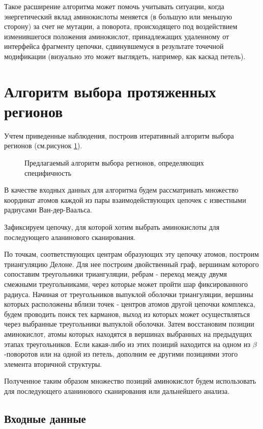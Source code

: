 Такое расширение алгоритма может помочь учитывать ситуации, когда энергетический вклад аминокислоты меняется (в большую или меньшую сторону) за счет не мутации, а поворота, происходящего под воздействием изменившегося положения аминокислот, принадлежащих удаленному от интерфейса фрагменту цепочки, сдвинувшемуся в результате точечной модификации (визуально это может выглядеть, например, как каскад петель). 



\section{Алгоритм выбора протяженных регионов}
Учтем приведенные наблюдения, построив итеративный алгоритм выбора регионов (см.рисунок \ref{fig:algo_scheme}).
\begin{figure}
\resizebox{\linewidth}{!}{
\algoscheme
}
\caption{\small{Предлагаемый алгоритм выбора регионов, определяющих специфичность }}
\label{fig:algo_scheme}
\end{figure}
В качестве входных данных для алгоритма будем рассматривать множество координат атомов каждой из пары взаимодействующих цепочек с известными радиусами Ван-дер-Ваальса.

Зафиксируем цепочку, для которой хотим выбрать аминокислоты для последующего аланинового сканирования. 

По точкам, соответствующих центрам образующих эту цепочку атомов, построим триангуляцию Делоне. Для нее построим двойственный граф, вершинам которого сопоставим треугольники триангуляции, ребрам - переход между двумя смежными треугольниками, через которые может пройти  шар фиксированного радиуса. Начиная от треугольников выпуклой оболочки триангуляции, вершины которых расположены вблизи точек - центров атомов другой цепочки комплекса, будем проводить поиск тех карманов, выход из которых может осуществляться через выбранные треугольники выпуклой оболочки. Затем  восстановим позиции аминокислот, атомы которых находятся в вершинах выбранных на предыдущих этапах треугольников. Если какая-либо из этих позиций находится на одном из $\beta$-поворотов или на одной из петель, дополним ее другими позициями этого элемента вторичной структуры.   

Полученное таким образом множество позиций аминокислот будем использовать для последующего аланинового сканирования или дальнейшего анализа.


\newpage
\subsection{Входные данные}

